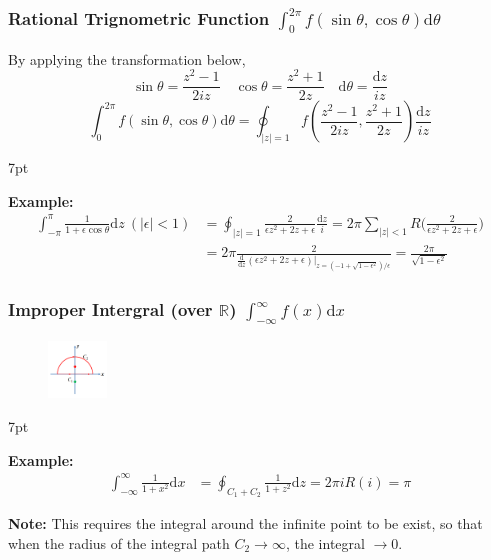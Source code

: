 \documentclass[10pt]{article}
\newcommand{\dd}{\mathrm{d}}
\newenvironment{formal}[2]{%
	\def\FrameCommand{%
		\hspace{1pt}%
		{\color{#1}\vrule width 2pt}%
		{\color{#2}\vrule width 4pt}%
		\colorbox{#2}%
	}%
	\MakeFramed{\advance\hsize-\width\FrameRestore}%
	\noindent\hspace{-4.55pt}%
	\begin{adjustwidth}{}{7pt}%
		\vspace{2pt}\vspace{2pt}%
	}
	{%
		\vspace{2pt}\end{adjustwidth}\endMakeFramed%
}
\begin{document}
\subsubsection[Rational Trignometric Function]{Rational Trignometric Function $\int_{0}^{2\pi} f(\sin \theta, \cos \theta) \dd \theta$}
By applying the transformation below,
$$
\sin \theta = \frac{z^2-1}{2iz} \quad \cos \theta = \frac{z^2+1}{2z} \quad \dd \theta = \frac{\dd z}{iz}
$$
$$
\int_{0}^{2\pi} f(\sin \theta, \cos \theta) \dd \theta = \oint_{|z|=1} f(\frac{z^2-1}{2iz}, \frac{z^2+1}{2z}) \frac{\dd z}{iz}
$$
\begin{formal}{Brown}{brownshade}
	
	\textbf{Example:}
	$$
	\begin{aligned}
		\int_{-\pi}^{\pi} \frac{1}{1+\epsilon \cos \theta} \dd z\ (|\epsilon|<1) &= \oint_{|z|=1} \frac{2}{\epsilon z^2+2z+\epsilon} \frac{\dd z}{i} = 2\pi\sum_{|z|<1} R\bigg(\frac{2}{\epsilon z^2+2z+\epsilon}\bigg)\\
		&= 2\pi \frac{2}{\frac{\dd}{\dd z}(\epsilon z^2+2z+\epsilon) \big|_{z=(-1+\sqrt{1-\epsilon^2})/\epsilon}} = \frac{2\pi}{\sqrt{1-\epsilon^2}}
	\end{aligned}
	$$
	
\end{formal}

\subsubsection[Improper Intergral]{Improper Intergral (over $\mathbb{R}$) $\int_{-\infty}^{\infty} f(x) \dd x$}


\begin{figure}[h]
	\centering
	\includegraphics[width=0.14\textwidth]{img3-4}
\end{figure}
\begin{formal}{Brown}{brownshade}
	
	\textbf{Example:}
	\[
	\begin{aligned}
		\int_{-\infty}^{\infty} \frac{1}{1+x^2} \dd x &= \oint_{C_1+C_2} \frac{1}{1+z^2} \dd z = 2\pi i R(i) = \pi
	\end{aligned}
	\]
	
\textbf{Note:} This requires the integral around the infinite point to be exist, so that when the radius of the integral path $C_2 \rightarrow \infty$, the integral $\rightarrow 0$.

\end{formal}
\end{document}
